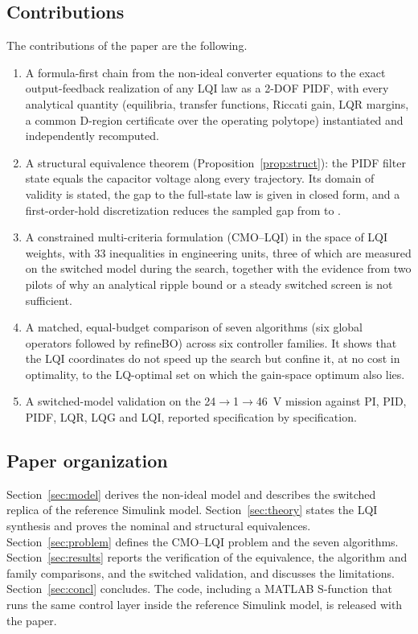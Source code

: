 \subsection{Contributions}\label{sec:contrib}
The contributions of the paper are the following.
\begin{enumerate}
\item A formula-first chain from the non-ideal converter equations to the
  exact output-feedback realization of any LQI law as a 2-DOF PIDF, with every
  analytical quantity (equilibria, transfer functions, Riccati gain, LQR
  margins, a common D-region certificate over the operating polytope)
  instantiated and independently recomputed.
\item A structural equivalence theorem (Proposition~\ref{prop:struct}): the
  PIDF filter state equals the capacitor voltage along every trajectory. Its
  domain of validity is stated, the gap to the full-state law is given in
  closed form, and a first-order-hold discretization reduces the sampled gap
  from \EqSampZOH{} to \EqSampFOH{}.
\item A constrained multi-criteria formulation (CMO--LQI) in the space of LQI
  weights, with 33 inequalities in engineering units, three of which are
  measured on the switched model during the search, together with the evidence
  from two pilots of why an analytical ripple bound or a steady switched screen
  is not sufficient.
\item A matched, equal-budget comparison of seven algorithms (six global
  operators followed by refineBO) across six controller families. It shows that
  the LQI coordinates do not speed up the search but confine it, at no cost in
  optimality, to the LQ-optimal set on which the gain-space optimum also lies.
\item A switched-model validation on the \SI{24}{}$\to$\SI{1}{}$\to$\SI{46}{V}
  mission against PI, PID, PIDF, LQR, LQG and LQI, reported specification by
  specification.
\end{enumerate}

\subsection{Paper organization}\label{sec:org}
Section~\ref{sec:model} derives the non-ideal model and describes the switched
replica of the reference Simulink model. Section~\ref{sec:theory} states the
LQI synthesis and proves the nominal and structural equivalences.
Section~\ref{sec:problem} defines the CMO--LQI problem and the seven algorithms.
Section~\ref{sec:results} reports the verification of the equivalence, the
algorithm and family comparisons, and the switched validation, and discusses
the limitations. Section~\ref{sec:concl} concludes. The code, including a MATLAB
S-function that runs the same control layer inside the reference Simulink
model, is released with the paper.
